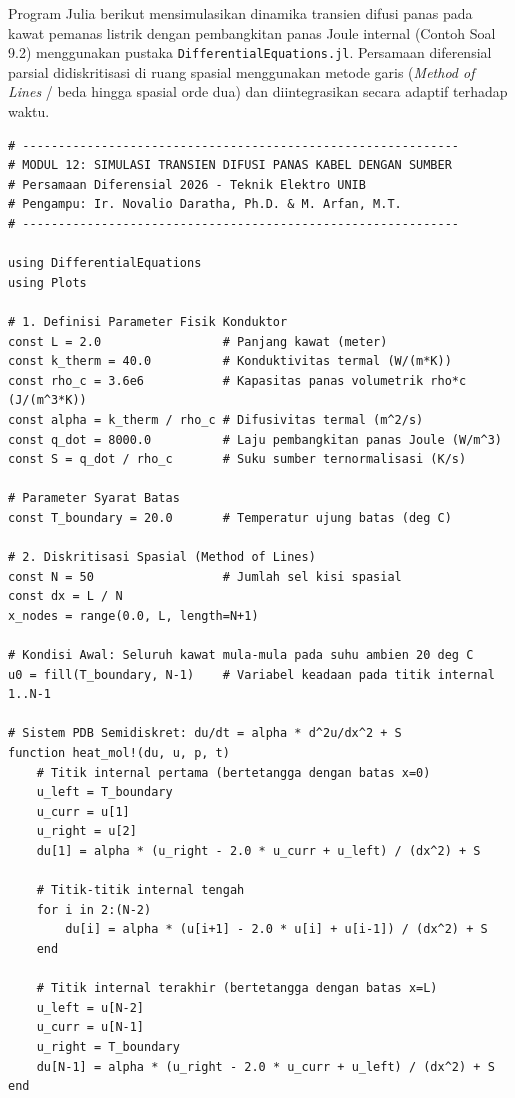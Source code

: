 \documentclass[11pt,a4paper]{article}
\theoremstyle{definition}
\begin{document}
Program Julia berikut mensimulasikan dinamika transien difusi panas pada kawat pemanas listrik dengan pembangkitan panas Joule internal (Contoh Soal 9.2) menggunakan pustaka \texttt{DifferentialEquations.jl}. Persamaan diferensial parsial didiskritisasi di ruang spasial menggunakan metode garis (\textit{Method of Lines} / beda hingga spasial orde dua) dan diintegrasikan secara adaptif terhadap waktu.

\begin{lstlisting}[style=juliastyle, caption={Skrip Julia simulasi difusi panas kabel listrik dengan pemanasan internal Joule.}, label={lst:julia_heat_internal}]
# -------------------------------------------------------------
# MODUL 12: SIMULASI TRANSIEN DIFUSI PANAS KABEL DENGAN SUMBER
# Persamaan Diferensial 2026 - Teknik Elektro UNIB
# Pengampu: Ir. Novalio Daratha, Ph.D. & M. Arfan, M.T.
# -------------------------------------------------------------

using DifferentialEquations
using Plots

# 1. Definisi Parameter Fisik Konduktor
const L = 2.0                 # Panjang kawat (meter)
const k_therm = 40.0          # Konduktivitas termal (W/(m*K))
const rho_c = 3.6e6           # Kapasitas panas volumetrik rho*c (J/(m^3*K))
const alpha = k_therm / rho_c # Difusivitas termal (m^2/s)
const q_dot = 8000.0          # Laju pembangkitan panas Joule (W/m^3)
const S = q_dot / rho_c       # Suku sumber ternormalisasi (K/s)

# Parameter Syarat Batas
const T_boundary = 20.0       # Temperatur ujung batas (deg C)

# 2. Diskritisasi Spasial (Method of Lines)
const N = 50                  # Jumlah sel kisi spasial
const dx = L / N
x_nodes = range(0.0, L, length=N+1)

# Kondisi Awal: Seluruh kawat mula-mula pada suhu ambien 20 deg C
u0 = fill(T_boundary, N-1)    # Variabel keadaan pada titik internal 1..N-1

# Sistem PDB Semidiskret: du/dt = alpha * d^2u/dx^2 + S
function heat_mol!(du, u, p, t)
    # Titik internal pertama (bertetangga dengan batas x=0)
    u_left = T_boundary
    u_curr = u[1]
    u_right = u[2]
    du[1] = alpha * (u_right - 2.0 * u_curr + u_left) / (dx^2) + S
    
    # Titik-titik internal tengah
    for i in 2:(N-2)
        du[i] = alpha * (u[i+1] - 2.0 * u[i] + u[i-1]) / (dx^2) + S
    end
    
    # Titik internal terakhir (bertetangga dengan batas x=L)
    u_left = u[N-2]
    u_curr = u[N-1]
    u_right = T_boundary
    du[N-1] = alpha * (u_right - 2.0 * u_curr + u_left) / (dx^2) + S
end


\end{lstlisting}
\end{document}

